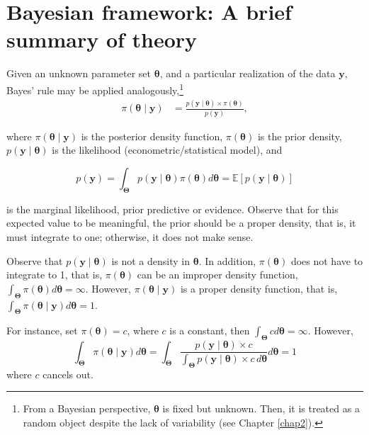 \section{Bayesian framework: A brief summary of theory}\label{sec12}

Given an unknown parameter set \( \bm{\theta} \), and a particular realization of the data \( \mathbf{y} \), Bayes' rule may be applied analogously,\footnote{From a Bayesian perspective, \( \bm{\theta} \) is fixed but unknown. Then, it is treated as a random object despite the lack of variability (see Chapter \ref{chap2}).}
\begin{align}
	\pi(\bm{\theta}\mid \mathbf{y})&=\frac{p(\mathbf{y}\mid \bm{\theta}) \times \pi(\bm{\theta})}{p(\mathbf{y})},
	\label{eq:121}
\end{align}

where $\pi(\bm{\theta}\mid \mathbf{y})$ is the posterior density function, $\pi(\bm{\theta})$ is the prior density, $p(\mathbf{y}\mid \bm{\theta})$ is the likelihood (econometric/statistical model), and

\begin{equation}
	p(\mathbf{y})=\int_{\mathbf{\Theta}}p(\mathbf{y}\mid \bm{\theta})\pi(\bm{\theta})d\bm{\theta}=\mathbb{E}\left[p(\mathbf{y}\mid \bm{\theta})\right]
	\label{eq:121a}
\end{equation}

is the marginal likelihood, prior predictive or evidence. Observe that for this expected value to be meaningful, the prior should be a proper density, that is, it must integrate to one; otherwise, it does not make sense.


Observe that \( p(\mathbf{y} \mid \bm{\theta}) \) is not a density in \( \bm{\theta} \). In addition, \( \pi(\bm{\theta}) \) does not have to integrate to 1, that is, \( \pi(\bm{\theta}) \) can be an improper density function, \( \int_{\mathbf{\Theta}} \pi(\bm{\theta}) d\bm{\theta} = \infty \). However, \( \pi(\bm{\theta} \mid \mathbf{y}) \) is a proper density function, that is, \( \int_{\mathbf{\Theta}} \pi(\bm{\theta} \mid \mathbf{y}) d\bm{\theta} = 1 \). 

For instance, set \( \pi(\bm{\theta}) = c \), where \( c \) is a constant, then \( \int_{\mathbf{\Theta}} c d\bm{\theta} = \infty \). However,
\[
\int_{\mathbf{\Theta}} \pi(\bm{\theta} \mid \mathbf{y}) d\bm{\theta} = \int_{\mathbf{\Theta}} \frac{p(\mathbf{y} \mid \bm{\theta}) \times c}{\int_{\mathbf{\Theta}} p(\mathbf{y} \mid \bm{\theta}) \times c \, d\bm{\theta}} d\bm{\theta} = 1
\]
where \( c \) cancels out. 

